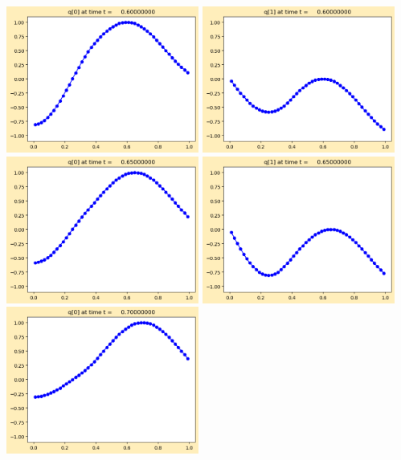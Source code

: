 \documentclass[11pt]{article}
\begin{document}
\vskip 10pt 
\includegraphics[width=0.475\textwidth]{frame0012fig0.png}
\includegraphics[width=0.475\textwidth]{frame0012fig1.png}
\vskip 10pt 
\includegraphics[width=0.475\textwidth]{frame0013fig0.png}
\includegraphics[width=0.475\textwidth]{frame0013fig1.png}
\vskip 10pt 
\includegraphics[width=0.475\textwidth]{frame0014fig0.png}
\end{document}
